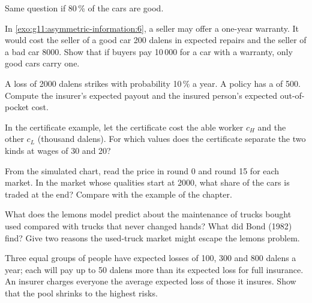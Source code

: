 \begin{exercise}[$\star\star$]\label{exo:g11:asymmetric-information:7}
Same question if 80\,\% of the cars are good.
\end{exercise}

\begin{exercise}[$\star\star$]\label{exo:g11:asymmetric-information:8}
In \cref{exo:g11:asymmetric-information:6}, a seller may offer a one-year warranty. It would cost the seller of a good car 200 dalens in expected repairs and the seller of a
bad car 8000. Show that if buyers pay 10\,000 for a car with a warranty, only good cars carry one.
\end{exercise}

\begin{exercise}[$\star\star$]\label{exo:g11:asymmetric-information:9}
A loss of 2000 dalens strikes with probability 10\,\% a year. A policy has a  of 500. Compute the insurer's expected payout and the insured person's expected
out-of-pocket cost.
\end{exercise}

\begin{exercise}[$\star\star$]\label{exo:g11:asymmetric-information:10}
In the certificate example, let the certificate cost the able worker $c_H$ and the other $c_L$ (thousand dalens). For which values does the certificate separate the two
kinds at wages of 30 and 20?
\end{exercise}

\begin{exercise}[$\star\star$]\label{exo:g11:asymmetric-information:11}
From the simulated chart, read the price in round 0 and round 15 for each market. In the market whose qualities start at 2000, what share of the cars is traded at the
end? Compare with the example of the chapter.
\end{exercise}

\begin{exercise}[$\star\star\star$]\label{exo:g11:asymmetric-information:12}
What does the lemons model predict about the maintenance of trucks bought used compared with trucks that never changed hands? What did Bond (1982) find? Give two
reasons the used-truck market might escape the lemons problem.
\end{exercise}

\begin{exercise}[$\star\star\star$]\label{exo:g11:asymmetric-information:13}
Three equal groups of people have expected losses of 100, 300 and 800 dalens a year; each will pay up to 50 dalens more than its expected loss for full insurance. An
insurer charges everyone the average expected loss of those it insures. Show that the pool shrinks to the highest risks.
\end{exercise}


